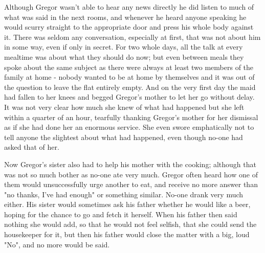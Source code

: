 Although Gregor wasn't able to hear any news directly he did listen to much of what was said in the next rooms, and whenever he heard anyone speaking he would scurry straight to the appropriate door and press his whole body against it. There was seldom any conversation, especially at first, that was not about him in some way, even if only in secret. For two whole days, all the talk at every mealtime was about what they should do now; but even between meals they spoke about the same subject as there were always at least two members of the family at home - nobody wanted to be at home by themselves and it was out of the question to leave the flat entirely empty. And on the very first day the maid had fallen to her knees and begged Gregor's mother to let her go without delay. It was not very clear how much she knew of what had happened but she left within a quarter of an hour, tearfully thanking Gregor's mother for her dismissal as if she had done her an enormous service. She even swore emphatically not to tell anyone the slightest about what had happened, even though no-one had asked that of her.

Now Gregor's sister also had to help his mother with the cooking; although that was not so much bother as no-one ate very much. Gregor often heard how one of them would unsuccessfully urge another to eat, and receive no more answer than "no thanks, I've had enough" or something similar. No-one drank very much either. His sister would sometimes ask his father whether he would like a beer, hoping for the chance to go and fetch it herself. When his father then said nothing she would add, so that he would not feel selfish, that she could send the housekeeper for it, but then his father would close the matter with a big, loud "No", and no more would be said.

